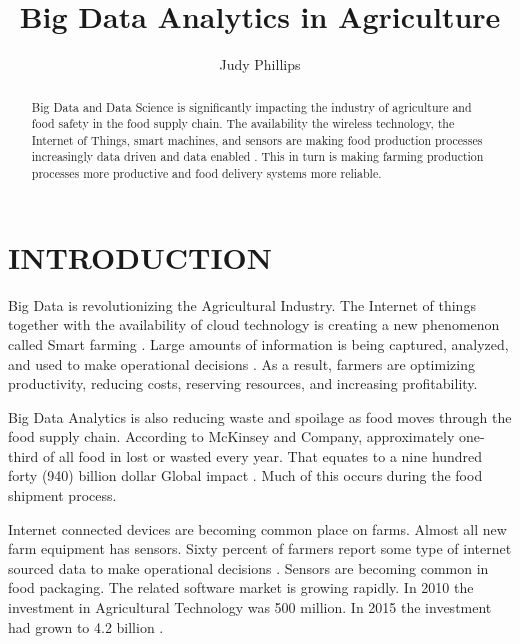 \documentclass[sigconf]{acmart}
\begin{document}
\title{Big Data Analytics in Agriculture}


\author{Judy Phillips}

\renewcommand{\shortauthors}{B. Trovato et al.}


\begin{abstract}
Big Data and Data Science is significantly impacting the industry of agriculture and food safety in the food supply chain. The availability the wireless technology, the Internet of Things, smart machines, and sensors are making food production processes increasingly data driven and data enabled \cite{Wolfert}. This in turn is making farming production processes more productive and food delivery systems more reliable. 
\end{abstract}



\maketitle

\section{INTRODUCTION}

Big Data is revolutionizing the Agricultural Industry. The Internet of things together with the availability of cloud technology is creating a new phenomenon called Smart farming \cite{Wolfert}. Large amounts of information is being captured, analyzed, and used to make operational decisions  \cite{DevEcon}.  As a result, farmers are optimizing productivity, reducing costs, reserving resources, and increasing profitability. 

Big Data Analytics is also reducing waste and spoilage as food moves through the food supply chain.  According to McKinsey and Company, approximately one-third of all food in lost or wasted every year.  That equates to a nine hundred forty (940) billion dollar Global impact \cite{www-google-bigdatatech}.  Much of this occurs during the food shipment process.  

Internet connected devices are becoming common place on farms. Almost all new farm equipment has sensors. Sixty percent of farmers report some type of internet sourced data to make operational decisions \cite{www-google-Farm}. Sensors are becoming common in food packaging.  The related software market is growing rapidly.  In 2010 the investment in Agricultural Technology was 500 million. In 2015 the investment had grown to 4.2 billion \cite{DevEcon}. 
\end{document}
